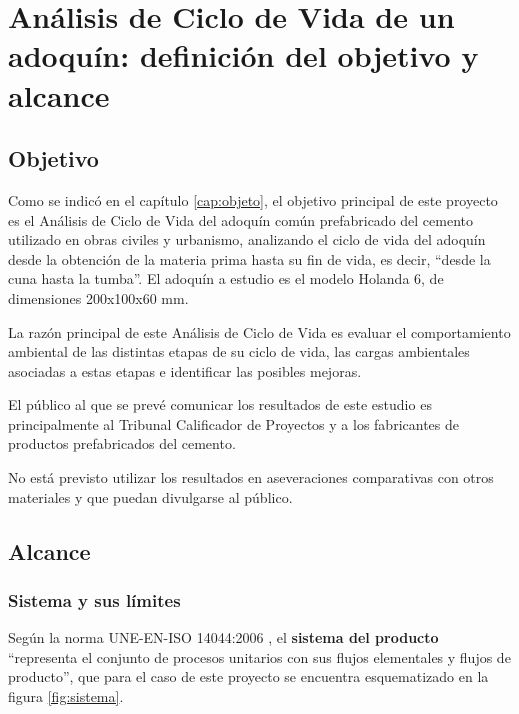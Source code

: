 \chapter{Análisis de Ciclo de Vida de un adoquín: definición del objetivo y alcance}\label{cap:acv_definicion}
\section{Objetivo}
Como se indicó en el capítulo \ref{cap:objeto}, el objetivo principal de este proyecto es el Análisis de Ciclo de Vida del adoquín común prefabricado del cemento utilizado en obras civiles y urbanismo, analizando el ciclo de vida del adoquín desde la obtención de la materia prima hasta su fin de vida, es decir, ``desde la cuna hasta la tumba''. El adoquín a estudio es el modelo Holanda 6, de dimensiones 200x100x60 \si{mm}.

La razón principal de este Análisis de Ciclo de Vida es evaluar el comportamiento ambiental de las distintas etapas de su ciclo de vida, las cargas ambientales asociadas a estas etapas e identificar las posibles mejoras.

El público al que se prevé comunicar los resultados de este estudio es principalmente al Tribunal Calificador de Proyectos y a los fabricantes de productos prefabricados del cemento.

No está previsto utilizar los resultados en aseveraciones comparativas con otros materiales y que puedan divulgarse al público.

\section{Alcance}
\subsection{Sistema y sus límites}
Según la norma UNE-EN-ISO 14044:2006 \cite{iso14044}, el \textbf{sistema del producto} ``representa el conjunto de procesos unitarios con sus flujos elementales y flujos de producto'', que para el caso de este proyecto se encuentra esquematizado en la figura \ref{fig:sistema}.

